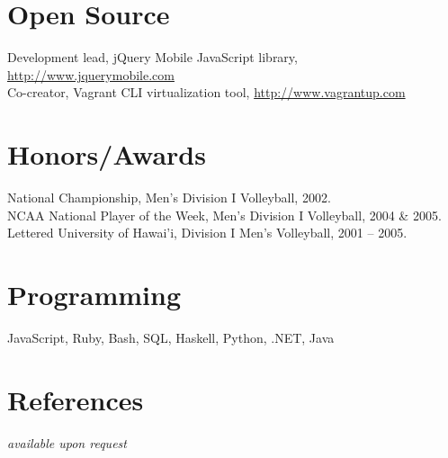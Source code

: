 \documentclass[margin,line]{resume}
\begin{document}
\begin{resume}
  \section{\mysidestyle Open Source}

  Development lead, jQuery Mobile JavaScript library, \url{http://www.jquerymobile.com} \vspace{1mm}\\
  Co-creator, Vagrant CLI virtualization tool, \url{http://www.vagrantup.com}

  \section{\mysidestyle Honors/Awards}

  National Championship, Men's Division I Volleyball, 2002.\vspace{1mm}\\
  NCAA National Player of the Week, Men's Division I Volleyball, 2004 \& 2005.\vspace{1mm}\\
  Lettered University of Hawai'i, Division I Men's Volleyball, 2001 -- 2005.

  \section{\mysidestyle Programming}
  JavaScript, Ruby, Bash, SQL, Haskell, Python, .NET, Java

  \section{\mysidestyle References}
  \textsl{available upon request}

\end{resume}
\end{document}
